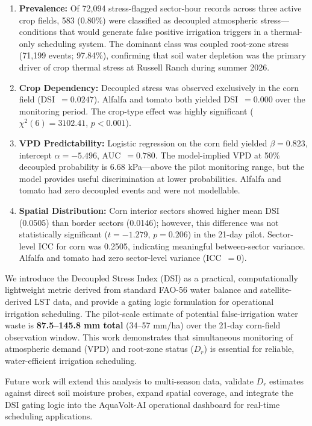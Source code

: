 \documentclass[review,12pt]{elsarticle}
\begin{document}
\begin{enumerate}
  \item \textbf{Prevalence:} Of 72,094 stress-flagged sector-hour records across three active crop fields, 583 (0.80\%) were classified as decoupled atmospheric stress---conditions that would generate false positive irrigation triggers in a thermal-only scheduling system. The dominant class was coupled root-zone stress (71,199 events; 97.84\%), confirming that soil water depletion was the primary driver of crop thermal stress at Russell Ranch during summer 2026.
  \item \textbf{Crop Dependency:} Decoupled stress was observed exclusively in the corn field (DSI~$= 0.0247$). Alfalfa and tomato both yielded DSI~$= 0.000$ over the monitoring period. The crop-type effect was highly significant ($\chi^2(6) = 3102.41$, $p < 0.001$).
  \item \textbf{VPD Predictability:} Logistic regression on the corn field yielded $\beta = 0.823$, intercept $\alpha = -5.496$, AUC~$= 0.780$. The model-implied VPD at 50\% decoupled probability is 6.68 kPa---above the pilot monitoring range, but the model provides useful discrimination at lower probabilities. Alfalfa and tomato had zero decoupled events and were not modellable.
  \item \textbf{Spatial Distribution:} Corn interior sectors showed higher mean DSI (0.0505) than border sectors (0.0146); however, this difference was not statistically significant ($t = -1.279$, $p = 0.206$) in the 21-day pilot. Sector-level ICC for corn was 0.2505, indicating meaningful between-sector variance. Alfalfa and tomato had zero sector-level variance (ICC~$= 0$).
\end{enumerate}

We introduce the Decoupled Stress Index (DSI) as a practical, computationally lightweight metric derived from standard FAO-56 water balance and satellite-derived LST data, and provide a gating logic formulation for operational irrigation scheduling. The pilot-scale estimate of potential false-irrigation water waste is \textbf{87.5--145.8 mm total} (34--57 mm/ha) over the 21-day corn-field observation window. This work demonstrates that simultaneous monitoring of atmospheric demand (VPD) and root-zone status ($D_r$) is essential for reliable, water-efficient irrigation scheduling.

Future work will extend this analysis to multi-season data, validate $D_r$ estimates against direct soil moisture probes, expand spatial coverage, and integrate the DSI gating logic into the AquaVolt-AI operational dashboard for real-time scheduling applications.
\end{document}
